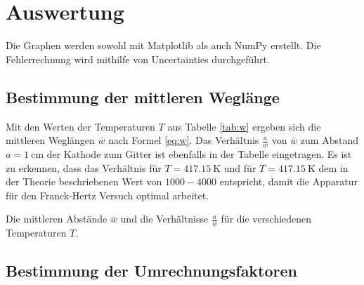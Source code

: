 \section{Auswertung}
\label{sec:Auswertung}

Die Graphen werden sowohl mit Matplotlib \cite{matplotlib} als auch NumPy \cite{numpy} erstellt. Die Fehlerrechnung wird mithilfe von Uncertainties \cite{uncertainties} durchgeführt.

\subsection{Bestimmung der mittleren Weglänge}

Mit den Werten der Temperaturen $T$ aus Tabelle \ref{tab:w} ergeben sich die mittleren Weglängen $\bar{w}$ nach Formel \eqref{eq:w}. Das Verhältnis $\frac{a}{\bar{w}}$ von $\bar{w}$ zum Abstand $a=\SI{1}{\centi\metre}$ der Kathode zum Gitter ist ebenfalls in der Tabelle eingetragen. Es ist zu erkennen, dass das Verhältnis für $T = \SI{417,15}{\kelvin}$ und für $T = \SI{417,15}{\kelvin}$ dem in der Theorie beschriebenen Wert von $1000-4000$ entspricht, damit die Apparatur für den Franck-Hertz Versuch optimal arbeitet.

\begin{table}
\centering
\caption{Die mittleren Abstände $\bar{w}$ und die Verhältnisse $\frac{a}{\bar{w}}$ für die verschiedenen Temperaturen $T$.}

\label{tab:w}
\end{table}

\subsection{Bestimmung der Umrechnungsfaktoren}

